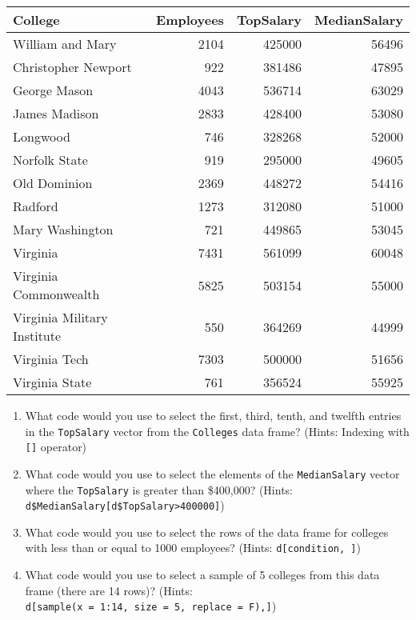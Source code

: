 \documentclass[
]{book}
\providecommand{\tightlist}{%
  \setlength{\itemsep}{0pt}\setlength{\parskip}{0pt}}
\begin{document}
\begin{tabular}{l|r|r|r}
\hline
College & Employees & TopSalary & MedianSalary\\
\hline
William and Mary & 2104 & 425000 & 56496\\
\hline
Christopher Newport & 922 & 381486 & 47895\\
\hline
George Mason & 4043 & 536714 & 63029\\
\hline
James Madison & 2833 & 428400 & 53080\\
\hline
Longwood & 746 & 328268 & 52000\\
\hline
Norfolk State & 919 & 295000 & 49605\\
\hline
Old Dominion & 2369 & 448272 & 54416\\
\hline
Radford & 1273 & 312080 & 51000\\
\hline
Mary Washington & 721 & 449865 & 53045\\
\hline
Virginia & 7431 & 561099 & 60048\\
\hline
Virginia Commonwealth & 5825 & 503154 & 55000\\
\hline
Virginia Military Institute & 550 & 364269 & 44999\\
\hline
Virginia Tech & 7303 & 500000 & 51656\\
\hline
Virginia State & 761 & 356524 & 55925\\
\hline
\end{tabular}

\begin{enumerate}
\def\labelenumi{\arabic{enumi}.}
\tightlist
\item
  What code would you use to select the first, third, tenth, and twelfth entries in the \texttt{TopSalary} vector from the \texttt{Colleges} data frame? (Hints: Indexing with \texttt{{[}{]}} operator)
\item
  What code would you use to select the elements of the \texttt{MedianSalary} vector where the \texttt{TopSalary} is greater than \$400,000? (Hints: \texttt{d\$MedianSalary{[}d\$TopSalary\textgreater{}400000{]}})
\item
  What code would you use to select the rows of the data frame for colleges with less than or equal to 1000 employees? (Hints: \texttt{d{[}condition,\ {]}})
\item
  What code would you use to select a sample of 5 colleges from this data frame (there are 14 rows)? (Hints: \texttt{d{[}sample(x\ =\ 1:14,\ size\ =\ 5,\ replace\ =\ F),{]}})
\end{enumerate}
\end{document}
